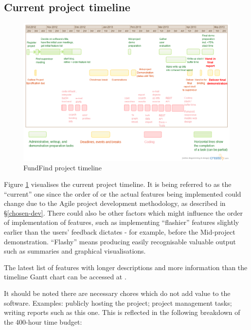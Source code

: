 \documentclass[11pt,fleqn,twoside]{article}
\begin{document}
\newpage

\subsection{Current project timeline}
\label{timeline}

\begin{figure}[H]
\centering
\includegraphics[height=0.6\textheight,angle=90]{timeline.png}
\caption{FundFind project timeline}
\label{fig:timeline}
\end{figure}

Figure \ref{fig:timeline} visualises the current project timeline. It is being referred to as the ``current'' one since the order of or the actual features being implemented could change due to the Agile project development methodology, as described in \S\ref{chosen-dev}. There could also be other factors which might influence the order of implementation of features, such as implementing ``flashier'' features slightly earlier than the users' feedback dictates - for example, before the Mid-project demonstration. ``Flashy'' means producing easily recognisable valuable output such as summaries and graphical visualisations.

The latest list of features with longer descriptions and more information than the timeline Gantt chart can be accessed at \cite{pm}.

It should be noted there are necessary chores which do not add value to the software. Examples: publicly hosting the project; project management tasks; writing reports such as this one. This is reflected in the following breakdown of the 400-hour time budget:
\end{document}
